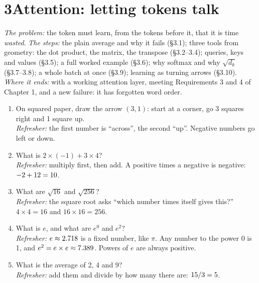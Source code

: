 \newpage
\section*{3\quad Attention: letting tokens talk}

\begin{chaptermap}
\emph{The problem:} the token  must learn, from the tokens before it, that it is time \emph{wasted}.
\emph{The steps:} the plain average and why it fails (\S3.1); three tools from geometry: the dot product, the
matrix, the transpose (\S3.2--3.4); queries, keys and values (\S3.5); a full worked example (\S3.6); why softmax
and why $\sqrt{d_k}$ (\S3.7--3.8); a whole batch at once (\S3.9); learning as turning arrows (\S3.10).
\emph{Where it ends:} with a working attention layer, meeting Requirements 3 and 4 of Chapter 1, and a new
failure: it has forgotten word order.
\end{chaptermap}


\begin{beforeyoustart}
\begin{enumerate}[label=\arabic*.,leftmargin=1.6em]
\item On squared paper, draw the arrow $(3,1)$: start at a corner, go 3 squares right and 1 square up.\\
\emph{Refresher:} the first number is ``across'', the second ``up''. Negative numbers go left or down.
\item What is $2\times(-1)+3\times4$?\\
\emph{Refresher:} multiply first, then add. A positive times a negative is negative: $-2+12=10$.
\item What are $\sqrt{16}$ and $\sqrt{256}$?\\
\emph{Refresher:} the square root asks ``which number times itself gives this?'' $4\times4=16$ and
$16\times16=256$.
\item What is $e$, and what are $e^0$ and $e^2$?\\
\emph{Refresher:} $e\approx2.718$ is a fixed number, like $\pi$. Any number to the power 0 is 1, and
$e^2=e\times e\approx7.389$. Powers of $e$ are always positive.
\item What is the average of 2, 4 and 9?\\
\emph{Refresher:} add them and divide by how many there are: $15/3=5$.
\end{enumerate}
\end{beforeyoustart}

